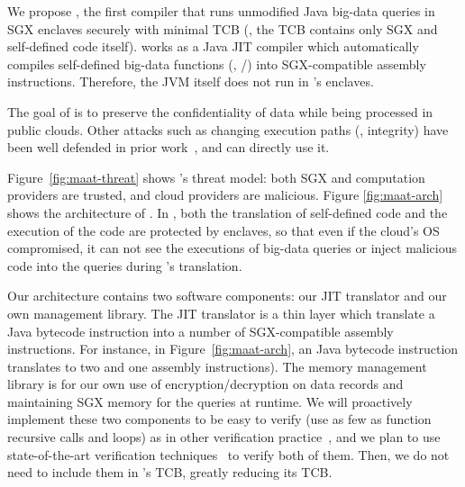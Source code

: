 We propose \maat, the first compiler that runs unmodified Java big-data queries 
in SGX enclaves securely with minimal TCB (\ie, the TCB contains only SGX and 
self-defined code itself). \maat works as a Java JIT compiler which 
automatically compiles self-defined big-data functions (\eg, 
/) into SGX-compatible assembly instructions. 
Therefore, the 
JVM itself does not run in \maat's enclaves.

The goal of \maat is to preserve the confidentiality of data while being 
processed in public clouds. Other attacks such as changing execution paths 
(\ie, integrity) have been well defended in prior work~\cite{jitguard:ccs17}, 
and \maat can directly use it.

Figure~\ref{fig:maat-threat} shows \maat's threat model: both SGX and 
computation providers are trusted, and cloud providers are malicious. Figure 
\ref{fig:maat-arch} shows the architecture of \maat. In \maat, both the 
translation of self-defined code and the execution of the code are protected by 
enclaves, so that even if the cloud's OS compromised, it can not see the 
executions of big-data queries or inject malicious code into the queries during 
\maat's translation.

Our \maat architecture contains two software components: our JIT translator 
and our own management library. The JIT translator is a thin layer which 
translate a Java bytecode instruction into a number of SGX-compatible 
assembly instructions. For instance, in Figure~\ref{fig:maat-arch}, an 
 Java bytecode instruction translates to two  and one 
 assembly instructions). The memory management library is for our own 
use of encryption/decryption on data records and maintaining SGX memory for the 
queries at runtime. We will proactively implement these two components to be 
easy to verify (use as few as function recursive calls and loops) as in other 
verification practice~\cite{xi:sosp17}, and we plan to use state-of-the-art 
verification techniques~\cite{xi:sosp17} to verify both of them. Then, we do not 
need to include them in \maat's TCB, greatly reducing its TCB.





